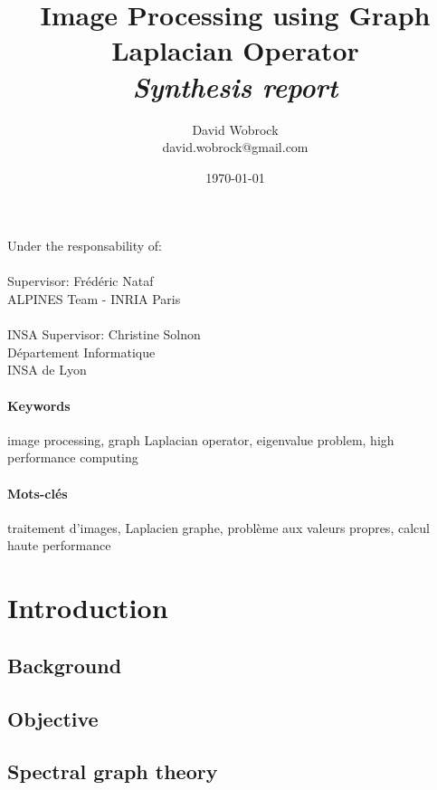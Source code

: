 \documentclass[]{article}
\title{Image Processing using Graph Laplacian Operator \\ \textit{Synthesis report}}
\author{David Wobrock \\ david.wobrock@gmail.com}
\date{\today}
\begin{document}
\maketitle

Under the responsability of:\\ \\
Supervisor: Frédéric Nataf\\
ALPINES Team - INRIA Paris\\ \\
INSA Supervisor: Christine Solnon\\
Département Informatique\\
INSA de Lyon

\begin{abstract}
 
\end{abstract}

\paragraph{Keywords}
image processing, graph Laplacian operator, eigenvalue problem, high performance computing

\begin{otherlanguage}{french}
  \begin{abstract}
   
  \end{abstract}
\end{otherlanguage}

\paragraph{Mots-clés}
traitement d'images, Laplacien graphe, problème aux valeurs propres, calcul haute performance

\section{Introduction}

\subsection{Background}


\subsection{Objective}


\subsection{Spectral graph theory}

\end{document}
